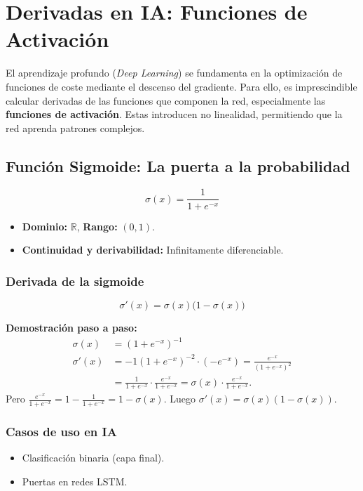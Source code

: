 \documentclass[12pt,a4paper,openany,oneside]{book}
\begin{document}
\section{Derivadas en IA: Funciones de Activación}

El aprendizaje profundo (\textit{Deep Learning}) se fundamenta en la optimización de funciones de coste mediante el descenso del gradiente. Para ello, es imprescindible calcular derivadas de las funciones que componen la red, especialmente las \textbf{funciones de activación}. Estas introducen no linealidad, permitiendo que la red aprenda patrones complejos.

\subsection{Función Sigmoide: La puerta a la probabilidad}

\begin{equation}
\sigma(x) = \frac{1}{1 + e^{-x}}
\end{equation}

\begin{itemize}
    \item \textbf{Dominio:} $\mathbb{R}$, \textbf{Rango:} $(0,1)$.
    \item \textbf{Continuidad y derivabilidad:} Infinitamente diferenciable.
\end{itemize}

\subsubsection{Derivada de la sigmoide}
\begin{equation}
\sigma'(x) = \sigma(x) \bigl(1 - \sigma(x)\bigr)
\end{equation}

\textbf{Demostración paso a paso:}
\begin{align*}
\sigma(x) &= (1 + e^{-x})^{-1} \\
\sigma'(x) &= -1 (1 + e^{-x})^{-2} \cdot (-e^{-x}) = \frac{e^{-x}}{(1 + e^{-x})^2} \\
&= \frac{1}{1 + e^{-x}} \cdot \frac{e^{-x}}{1 + e^{-x}} = \sigma(x) \cdot \frac{e^{-x}}{1 + e^{-x}}.
\end{align*}
Pero $\frac{e^{-x}}{1 + e^{-x}} = 1 - \frac{1}{1 + e^{-x}} = 1 - \sigma(x)$. Luego $\sigma'(x) = \sigma(x)(1 - \sigma(x))$.

\subsubsection{Casos de uso en IA}
\begin{itemize}
    \item Clasificación binaria (capa final).
    \item Puertas en redes LSTM.
\end{itemize}
\end{document}
